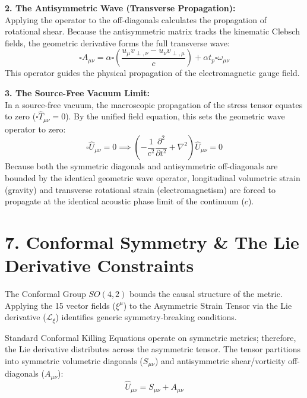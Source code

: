 \textbf{2. The Antisymmetric Wave (Transverse Propagation):} \\
Applying the operator to the off-diagonals calculates the propagation of rotational shear. Because the antisymmetric matrix tracks the kinematic Clebsch fields, the geometric derivative forms the full transverse wave: 
\begin{equation}
    \square A_{\mu\nu} = \alpha \square \left( \frac{u_\mu v_{\perp, \nu} - u_\nu v_{\perp, \mu}}{c} \right) + \alpha t_p \square \omega_{\mu\nu} 
\end{equation}
This operator guides the physical propagation of the electromagnetic gauge field. 

\textbf{3. The Source-Free Vacuum Limit:} \\
In a source-free vacuum, the macroscopic propagation of the stress tensor equates to zero ($\square \hat{T}_{\mu\nu} = 0$). By the unified field equation, this sets the geometric wave operator to zero: 
\begin{equation}
    \square \hat{U}_{\mu\nu} = 0 \implies \left( -\frac{1}{c^2}\frac{\partial^2}{\partial t^2} + \nabla^2 \right) \hat{U}_{\mu\nu} = 0
\end{equation}
Because both the symmetric diagonals and antisymmetric off-diagonals are bounded by the identical geometric wave operator, longitudinal volumetric strain (gravity) and transverse rotational strain (electromagnetism) are forced to propagate at the identical acoustic phase limit of the continuum ($c$).

\section*{7. Conformal Symmetry \& The Lie Derivative Constraints}
The Conformal Group $SO(4,2)$ bounds the causal structure of the metric. Applying the 15 vector fields ($\xi^\mu$) to the Asymmetric Strain Tensor via the Lie derivative ($\mathcal{L}_\xi$) identifies generic symmetry-breaking conditions.

Standard Conformal Killing Equations operate on symmetric metrics; therefore, the Lie derivative distributes across the asymmetric tensor. The tensor partitions into symmetric volumetric diagonals ($S_{\mu\nu}$) and antisymmetric shear/vorticity off-diagonals ($A_{\mu\nu}$):
\begin{equation}
    \hat{U}_{\mu\nu} = S_{\mu\nu} + A_{\mu\nu}
\end{equation}

